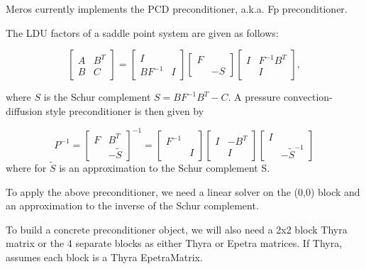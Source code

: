 Meros currently implements the PCD preconditioner, a.k.a. Fp
preconditioner. 

The LDU factors of a saddle point system are given as follows:

\begin{equation}
  \left[ \begin{array}{cc} A & B^T \\ B & C \end{array} \right]
     = \left[ \begin{array}{cc} I & \\ BF^{-1} & I \end{array} \right]
       \left[ \begin{array}{cc} F & \\  & -S \end{array} \right]
       \left[ \begin{array}{cc} I & F^{-1} B^T  \\  & I \end{array} \right],
\end{equation}

where $S$ is the Schur complement $S = B F^{-1} B^T - C$.  A
pressure convection-diffusion style preconditioner is then given by

\begin{equation}
  P^{-1} =
       \left[ \begin{array}{cc} F & B^T \\ & -\tilde S \end{array} \right]^{-1}
       = 
       \left[ \begin{array}{cc} F^{-1} &  \\  & I \end{array} \right]
       \left[ \begin{array}{cc} I & -B^T \\  & I \end{array} \right]
       \left[ \begin{array}{cc} I &  \\  & -\tilde S^{-1} \end{array} \right]
\end{equation}
where for $\tilde S$ is an approximation to the Schur complement S.

To apply the above preconditioner, we need a linear solver on the
(0,0) block and an approximation to the inverse of the Schur
complement.

To build a concrete preconditioner object, we will also need a 2x2
block Thyra matrix or the 4 separate blocks as either Thyra or Epetra
matrices.  If Thyra, assumes each block is a Thyra EpetraMatrix.

